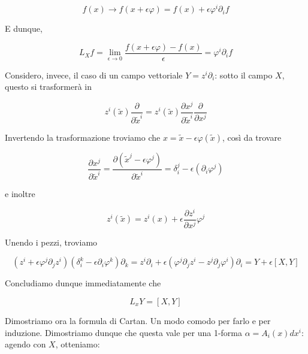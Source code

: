 \documentclass{report}
\begin{document}
\begin{equation}
    f(x) \rightarrow f(x+ \epsilon\varphi) = f(x) + \epsilon\varphi^i\partial_if
\end{equation}

E dunque, 

\begin{equation}
    L_Xf = \lim_{\epsilon \rightarrow 0} \frac{f(x+ \epsilon\varphi)- f(x)}{\epsilon} = \varphi^i\partial_if
\end{equation}

Considero, invece, il caso di un campo vettoriale $Y = z^i\partial_i$: sotto il campo $X$, questo si trasformerà in

\begin{equation}
    z^i(\tilde{x})\frac{\partial}{\partial \tilde{x}^i} = z^i(\tilde{x})\frac{\partial x^j}{\partial \tilde{x}^i}\frac{\partial}{\partial x^j}
\end{equation}

Invertendo la trasformazione troviamo che $x = \tilde{x} - \epsilon\varphi(\tilde{x})$, così da trovare

\begin{equation}
    \frac{\partial x^j}{\partial \tilde{x}^i} = \frac{\partial (\tilde{x}^j - \epsilon\varphi^j)}{\partial \tilde{x}^i} = \delta^j_i - \epsilon(\partial_i\varphi^j)
\end{equation}

e inoltre 

\begin{equation}
    z^i(\tilde{x}) = z^i(x) + \epsilon\frac{\partial z^i}{\partial x^j}\varphi^j
\end{equation}

Unendo i pezzi, troviamo

\begin{equation}
    (z^i + \epsilon\varphi^j\partial_jz^i)(\delta_i^k - \epsilon \partial_i\varphi^k)\partial_k = z^i\partial_i + \epsilon(\varphi^j\partial_jz^i -z^j\partial_j\varphi^i)\partial_i = Y + \epsilon \left[X, Y \right]
\end{equation}

Concludiamo dunque immediatamente che 

\begin{equation}
    L_xY = \left[X, Y\right]
\end{equation}

Dimostriamo ora la formula di Cartan. Un modo comodo per farlo e per induzione. Dimostriamo dunque che questa vale per una 1-forma $\alpha = A_i(x)dx^i$: agendo con $X$, otteniamo: 
\end{document}
